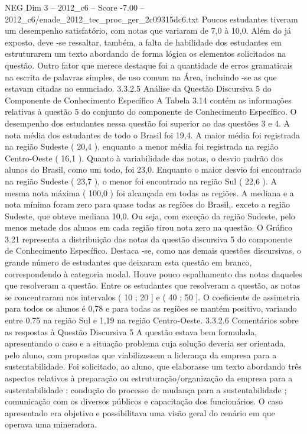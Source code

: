 \begin{textsample}{NEG Dim 3 – 2012\_c6 – Score -7.00 – 2012\_c6/enade\_2012\_tec\_proc\_ger\_2c09315dc6.txt}
Poucos estudantes tiveram um desempenho satisfatório, com notas que variaram de 7,0 à 10,0.
Além do já exposto, deve -se ressaltar, também, a falta de habilidade dos estudantes em estruturarem um texto abordando de forma lógica os elementos solicitados na questão.
Outro fator que merece destaque foi a quantidade de erros gramaticais na escrita de palavras simples, de uso comum na Área, incluindo -se as que estavam citadas no enunciado. 3.3.2.5 Análise da Questão Discursiva 5 do Componente de Conhecimento Específico A Tabela 3.14 contém as informações relativas à questão 5 do conjunto do componente de Conhecimento Específico.
O desempenho dos estudantes nessa questão foi superior ao das questões 3 e 4.
A nota média dos estudantes de todo o Brasil foi 19,4.
A maior média foi registrada na região Sudeste ( 20,4 ), enquanto a menor média foi registrada na região Centro-Oeste ( 16,1 ).
Quanto à variabilidade das notas, o desvio padrão dos alunos do Brasil, como um todo, foi 23,0.
Enquanto o maior desvio foi encontrado na região Sudeste ( 23,7 ), o menor foi encontrado na região Sul ( 22,6 ).
A mesma nota máxima ( 100,0 ) foi alcançada em todas as regiões.
A mediana e a nota mínima foram zero para quase todas as regiões do Brasil,. exceto a região Sudeste, que obteve mediana 10,0.
Ou seja, com exceção da região Sudeste, pelo menos metade dos alunos em cada região tirou nota zero na questão.
O Gráfico 3.21 representa a distribuição das notas da questão discursiva 5 do componente de Conhecimento Específico.
Destaca -se, como nas demais questões discursivas, o grande número de estudantes que deixaram esta questão em branco, correspondendo à categoria modal.
Houve pouco espalhamento das notas daqueles que resolveram a questão.
Entre os estudantes que resolveram a questão, as notas se concentraram nos intervalos ( 10 ; 20 ] e ( 40 ; 50 ].
O coeficiente de assimetria para todos os alunos é 0,78 e para todas as regiões se mantém positivo, variando entre 0,75 na região Sul e 1,19 na região Centro-Oeste. 3.3.2.6 Comentários sobre as respostas à Questão Discursiva 5 A questão estava bem formulada, apresentando o caso e a situação problema cuja solução deveria ser orientada, pelo aluno, com propostas que viabilizassem a liderança da empresa para a sustentabilidade.
Foi solicitado, ao aluno, que elaborasse um texto abordando três aspectos relativos à preparação ou estruturação/organização da empresa para a sustentabilidade : condução do processo de mudança para a sustentabilidade ; comunicação com os diversos públicos e capacitação dos funcionários.
O caso apresentado era objetivo e possibilitava uma visão geral do cenário em que operava uma mineradora.

\end{textsample}

